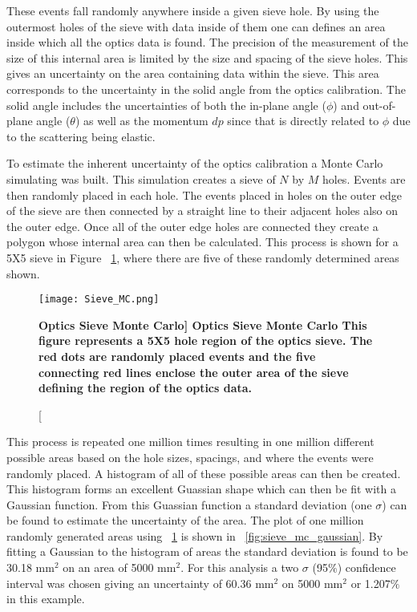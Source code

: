 These events fall randomly anywhere inside a given sieve hole. By using the outermost holes of the sieve with data inside of them one can defines an area inside which all the optics data is found. The precision of the measurement of the size of this internal area is limited by the size and spacing of the sieve holes. This gives an uncertainty on the area containing data within the sieve. This area corresponds to the uncertainty in the solid angle from the optics calibration. The solid angle includes the uncertainties of both the in-plane angle ($\phi$) and out-of-plane angle ($\theta$) as well as the momentum $dp$ since that is directly related to $\phi$ due to the scattering being elastic.  

To estimate the inherent uncertainty of the optics calibration a Monte Carlo simulating was built. This simulation creates a sieve of $N$ by $M$ holes. Events are then randomly placed in each hole. The events placed in holes on the outer edge of the sieve are then connected by a straight line to their adjacent holes also on the outer edge. Once all of the outer edge holes are connected they create a polygon whose internal area can then be calculated. This process is shown for a 5X5 sieve in Figure ~\ref{fig:sieve_mc}, where there are five of these randomly determined areas shown. 

\begin{figure}[!ht]
\begin{center}
\texttt{[image: Sieve\_MC.png]}
\end{center}
\caption[\bf{Optics Sieve Monte Carlo}]{
{\bf{Optics Sieve Monte Carlo}} This figure represents a 5X5 hole region of the optics sieve. The red dots are randomly placed events and the five connecting red lines enclose the outer area of the sieve defining the region of the optics data.}
\label{fig:sieve_mc}
\end{figure}

This process is repeated one million times resulting in one million different possible areas based on the hole sizes, spacings, and where the events were randomly placed. A histogram of all of these possible areas can then be created. This histogram forms an excellent Guassian shape which can then be fit with a Gaussian function. From this Guassian function a standard deviation (one $\sigma$) can be found to estimate the uncertainty of the area. The plot of one million randomly generated areas using ~\ref{fig:sieve_mc} is shown in ~\ref{fig:sieve_mc_gaussian}. By fitting a Gaussian to the histogram of areas the standard deviation is found to be 30.18 mm$^2$ on an area of 5000 mm$^2$. For this analysis a two $\sigma$ (95$\%$) confidence interval was chosen giving an uncertainty of 60.36 mm$^2$ on 5000 mm$^2$ or 1.207$\%$ in this example. 


